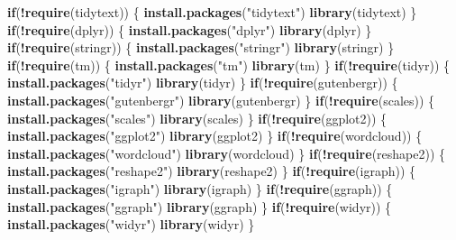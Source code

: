 \documentclass[]{article}
\newenvironment{Shaded}{\begin{snugshade}}{\end{snugshade}}
\newcommand{\ControlFlowTok}[1]{\textcolor[rgb]{0.13,0.29,0.53}{\textbf{#1}}}
\newcommand{\KeywordTok}[1]{\textcolor[rgb]{0.13,0.29,0.53}{\textbf{#1}}}
\newcommand{\NormalTok}[1]{#1}
\newcommand{\OperatorTok}[1]{\textcolor[rgb]{0.81,0.36,0.00}{\textbf{#1}}}
\newcommand{\StringTok}[1]{\textcolor[rgb]{0.31,0.60,0.02}{#1}}
\begin{document}
\begin{Shaded}
\begin{Highlighting}[]
\ControlFlowTok{if}\NormalTok{(}\OperatorTok{!}\KeywordTok{require}\NormalTok{(tidytext)) \{}
  \KeywordTok{install.packages}\NormalTok{(}\StringTok{"tidytext"}\NormalTok{)}
  \KeywordTok{library}\NormalTok{(tidytext)}
\NormalTok{\}}
\ControlFlowTok{if}\NormalTok{(}\OperatorTok{!}\KeywordTok{require}\NormalTok{(dplyr)) \{}
  \KeywordTok{install.packages}\NormalTok{(}\StringTok{"dplyr"}\NormalTok{)}
  \KeywordTok{library}\NormalTok{(dplyr)}
\NormalTok{\}}
\ControlFlowTok{if}\NormalTok{(}\OperatorTok{!}\KeywordTok{require}\NormalTok{(stringr)) \{}
  \KeywordTok{install.packages}\NormalTok{(}\StringTok{"stringr"}\NormalTok{)}
  \KeywordTok{library}\NormalTok{(stringr)}
\NormalTok{\}}
\ControlFlowTok{if}\NormalTok{(}\OperatorTok{!}\KeywordTok{require}\NormalTok{(tm)) \{}
  \KeywordTok{install.packages}\NormalTok{(}\StringTok{"tm"}\NormalTok{)}
  \KeywordTok{library}\NormalTok{(tm)}
\NormalTok{\}}
\ControlFlowTok{if}\NormalTok{(}\OperatorTok{!}\KeywordTok{require}\NormalTok{(tidyr)) \{}
  \KeywordTok{install.packages}\NormalTok{(}\StringTok{"tidyr"}\NormalTok{)}
  \KeywordTok{library}\NormalTok{(tidyr)}
\NormalTok{\}}
\ControlFlowTok{if}\NormalTok{(}\OperatorTok{!}\KeywordTok{require}\NormalTok{(gutenbergr)) \{}
  \KeywordTok{install.packages}\NormalTok{(}\StringTok{"gutenbergr"}\NormalTok{)}
  \KeywordTok{library}\NormalTok{(gutenbergr)}
\NormalTok{\}}
\ControlFlowTok{if}\NormalTok{(}\OperatorTok{!}\KeywordTok{require}\NormalTok{(scales)) \{}
  \KeywordTok{install.packages}\NormalTok{(}\StringTok{"scales"}\NormalTok{)}
  \KeywordTok{library}\NormalTok{(scales)}
\NormalTok{\}}
\ControlFlowTok{if}\NormalTok{(}\OperatorTok{!}\KeywordTok{require}\NormalTok{(ggplot2)) \{}
  \KeywordTok{install.packages}\NormalTok{(}\StringTok{"ggplot2"}\NormalTok{)}
  \KeywordTok{library}\NormalTok{(ggplot2)}
\NormalTok{\}}
\ControlFlowTok{if}\NormalTok{(}\OperatorTok{!}\KeywordTok{require}\NormalTok{(wordcloud)) \{}
  \KeywordTok{install.packages}\NormalTok{(}\StringTok{"wordcloud"}\NormalTok{)}
  \KeywordTok{library}\NormalTok{(wordcloud)}
\NormalTok{\}}
\ControlFlowTok{if}\NormalTok{(}\OperatorTok{!}\KeywordTok{require}\NormalTok{(reshape2)) \{}
  \KeywordTok{install.packages}\NormalTok{(}\StringTok{"reshape2"}\NormalTok{)}
  \KeywordTok{library}\NormalTok{(reshape2)}
\NormalTok{\}}
\ControlFlowTok{if}\NormalTok{(}\OperatorTok{!}\KeywordTok{require}\NormalTok{(igraph)) \{}
  \KeywordTok{install.packages}\NormalTok{(}\StringTok{"igraph"}\NormalTok{)}
  \KeywordTok{library}\NormalTok{(igraph)}
\NormalTok{\}}
\ControlFlowTok{if}\NormalTok{(}\OperatorTok{!}\KeywordTok{require}\NormalTok{(ggraph)) \{}
  \KeywordTok{install.packages}\NormalTok{(}\StringTok{"ggraph"}\NormalTok{)}
  \KeywordTok{library}\NormalTok{(ggraph)}
\NormalTok{\}}
\ControlFlowTok{if}\NormalTok{(}\OperatorTok{!}\KeywordTok{require}\NormalTok{(widyr)) \{}
  \KeywordTok{install.packages}\NormalTok{(}\StringTok{"widyr"}\NormalTok{)}
  \KeywordTok{library}\NormalTok{(widyr)}
\NormalTok{\}}
\end{Highlighting}
\end{Shaded}
\end{document}
